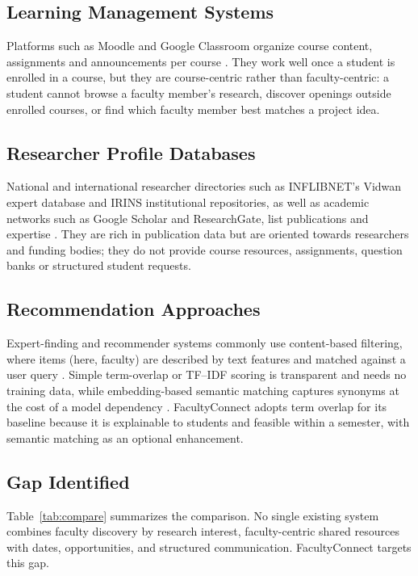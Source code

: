 \documentclass[conference]{IEEEtran}
\begin{document}
\subsection{Learning Management Systems}
Platforms such as Moodle and Google Classroom organize course content, assignments and announcements per course \cite{moodle,classroom}. They work well once a student is enrolled in a course, but they are course-centric rather than faculty-centric: a student cannot browse a faculty member's research, discover openings outside enrolled courses, or find which faculty member best matches a project idea.

\subsection{Researcher Profile Databases}
National and international researcher directories such as INFLIBNET's Vidwan expert database and IRINS institutional repositories, as well as academic networks such as Google Scholar and ResearchGate, list publications and expertise \cite{vidwan,irins,scholar}. They are rich in publication data but are oriented towards researchers and funding bodies; they do not provide course resources, assignments, question banks or structured student requests.

\subsection{Recommendation Approaches}
Expert-finding and recommender systems commonly use content-based filtering, where items (here, faculty) are described by text features and matched against a user query \cite{ricci,balog}. Simple term-overlap or TF--IDF scoring is transparent and needs no training data, while embedding-based semantic matching captures synonyms at the cost of a model dependency \cite{reimers}. FacultyConnect adopts term overlap for its baseline because it is explainable to students and feasible within a semester, with semantic matching as an optional enhancement.

\subsection{Gap Identified}
Table~\ref{tab:compare} summarizes the comparison. No single existing system combines faculty discovery by research interest, faculty-centric shared resources with dates, opportunities, and structured communication. FacultyConnect targets this gap.
\end{document}
